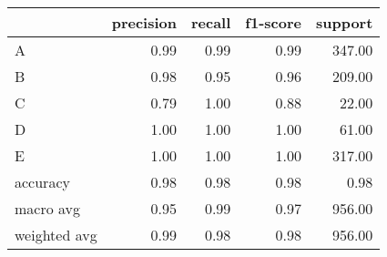 \begin{tabular}{|l|r|r|r|r|}
\hline
{} &  precision &  recall &  f1-score &  support \\
\hline
A            &       0.99 &    0.99 &      0.99 &   347.00 \\
B            &       0.98 &    0.95 &      0.96 &   209.00 \\
C            &       0.79 &    1.00 &      0.88 &    22.00 \\
D            &       1.00 &    1.00 &      1.00 &    61.00 \\
E            &       1.00 &    1.00 &      1.00 &   317.00 \\
accuracy     &       0.98 &    0.98 &      0.98 &     0.98 \\
macro avg    &       0.95 &    0.99 &      0.97 &   956.00 \\
weighted avg &       0.99 &    0.98 &      0.98 &   956.00 \\
\hline
\end{tabular}
